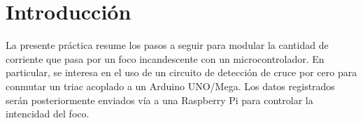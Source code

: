 %
%


\section{Introducción}%
\label{seq:introduction}
La presente práctica resume los pasos a seguir para modular la cantidad de corriente que pasa por un foco incandescente con un microcontrolador.
En particular, se interesa en el uso de un circuito de detección de cruce por cero para conmutar un triac acoplado a un Arduino UNO/Mega.
Los datos registrados serán posteriormente enviados vía \IIC a una Raspberry Pi para controlar la intencidad del foco.







